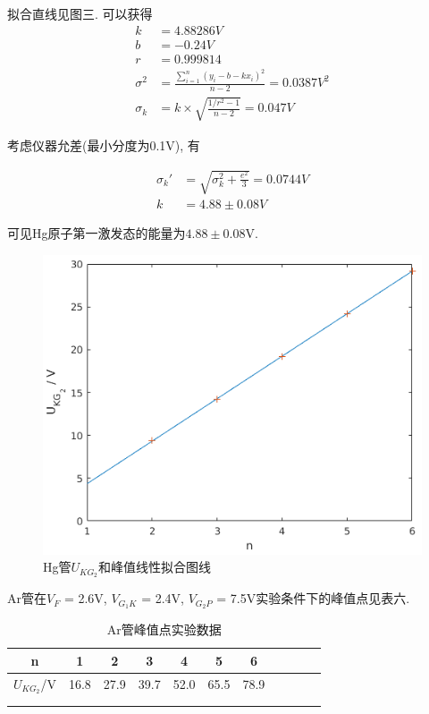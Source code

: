 \documentclass[a4paper,10pt,notitlepage]{article}
\begin{document}
	拟合直线见图三. 可以获得 \\
	
\begin{align*}
	k &= 4.88286V \\
	b &= -0.24V \\
	r &= 0.999814 \\
	\sigma^2 &= \frac{\sum_{i = 1}^{n}(y_i - b - kx_i)^2}{n - 2} = 0.0387 V^2 \\
	\sigma_k &= k \times \sqrt{\frac{1/r^2 - 1}{n - 2}} = 0.047V 
\end{align*}
	
	考虑仪器允差(最小分度为0.1V), 有
	
\begin{align*}
	\sigma_k' &= \sqrt{\sigma_k ^ 2 + \frac{e^2}{3}} = 0.0744V \\
	k &= 4.88 \pm 0.08 V
\end{align*}

	可见Hg原子第一激发态的能量为$4.88 \pm 0.08$V. \\
	
\begin{figure}
	\includegraphics[scale=0.76]{fh3.png}
	\caption{Hg管$U_{KG_2}$和峰值线性拟合图线}
\end{figure}

	Ar管在$V_F$ = 2.6V, $V_{G_1K}$ = 2.4V, $V_{G_2P}$ = 7.5V实验条件下的峰值点见表六.
	
\begin{center}

	\begin{longtable}{|c|c|c|c|c|c|c|c|c|c|c|}
	
	\hline
	n & 1 & 2 & 3 & 4 & 5 & 6 \\
	\hline
	$U_{KG_2}$/V & 16.8 & 27.9 & 39.7 & 52.0 & 65.5 & 78.9 \\
	\hline

	\multicolumn{1}{c}{ } \\
	\caption{Ar管峰值点实验数据}
	\end{longtable}

\end{center}
\end{document}
